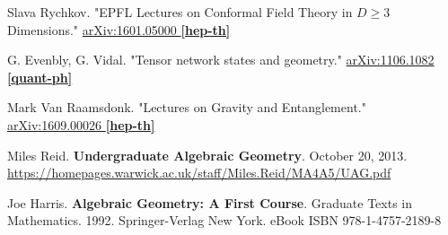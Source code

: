 \documentclass[10pt]{amsart}
\begin{document}
\begin{thebibliography}{9}
Slava Rychkov.  "EPFL Lectures on Conformal Field Theory in $D \geq 3$ Dimensions."    \href{https://arxiv.org/abs/1601.05000}{arXiv:1601.05000 \textbf{[hep-th]}}

G. Evenbly, G. Vidal.  "Tensor network states and geometry."  \href{https://arxiv.org/abs/1106.1082}{arXiv:1106.1082 \textbf{[quant-ph]}}

Mark Van Raamsdonk.  "Lectures on Gravity and Entanglement."  \href{https://arxiv.org/abs/1609.00026}{arXiv:1609.00026 \textbf{[hep-th]}}


Miles Reid. \textbf{Undergraduate Algebraic Geometry}. October 20, 2013. \url{https://homepages.warwick.ac.uk/staff/Miles.Reid/MA4A5/UAG.pdf}

Joe Harris. \textbf{Algebraic Geometry: A First Course}. Graduate Texts in Mathematics. 1992. Springer-Verlag New York.   eBook ISBN 978-1-4757-2189-8
    




\end{thebibliography}
\end{document}
